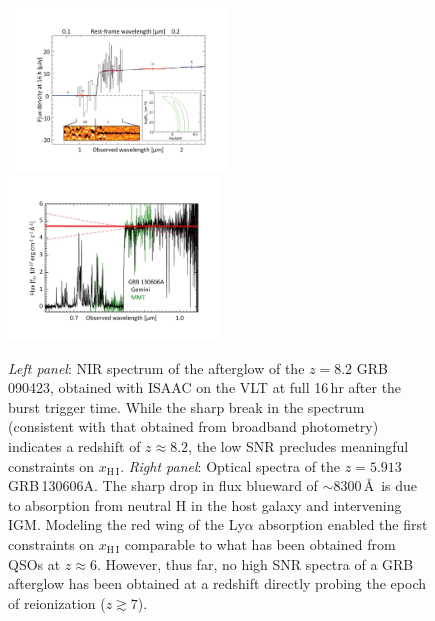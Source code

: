\documentclass[letterpaper,11pt]{article}
\begin{document}
\begin{figure}[tp!]
\begin{center}
\hbox{
\includegraphics[width=0.5\textwidth]{figures/Slide1.pdf}
\includegraphics[width=0.5\textwidth]{figures/Slide2.pdf}
}
\vspace{-1.5cm}
\end{center}
\caption{\footnotesize
{{\it Left panel}: NIR spectrum of the afterglow of the $z = 8.2$ 
GRB\,090423\cite{tfl+09}, obtained with ISAAC on the VLT at full 16\,hr
after the burst trigger time.  While the sharp break in the spectrum (consistent
with that obtained from broadband photometry) indicates a redshift of $z \approx
8.2$, the low SNR precludes meaningful constraints on $x_{\mathrm{H\,I}}$.
{\it Right panel}: Optical spectra of the $z = 5.913$ 
GRB\,130606A\cite{cbf+13}.  The sharp
drop in flux blueward of $\sim 8300$\,\AA\ is due to absorption from neutral H
in the host galaxy and intervening IGM.  Modeling the red wing of the Ly$\alpha$
absorption enabled the first constraints on $x_{\mathrm{H\,I}}$ 
comparable to what has been obtained
from QSOs at $z \approx 6$.  However, thus far, no high SNR spectra of a GRB
afterglow has been obtained at a redshift directly probing the epoch 
of reionization ($z \gtrsim 7$).}}
\label{fig1}
\end{figure}
\end{document}
